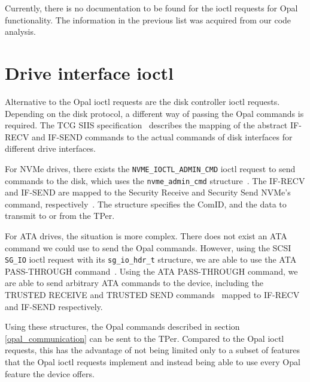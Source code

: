 Currently, there is no documentation to be found for the ioctl requests for Opal functionality. The information in the previous list was acquired from our code analysis.

\section{Drive interface ioctl}
\label{section:direct_communication_raw_ioctl}

Alternative to the Opal ioctl requests are the disk controller ioctl requests. Depending on the disk protocol, a different way of passing the Opal commands is required.
The TCG SIIS specification~\cite{tcg-siis} describes the mapping of the abstract IF-RECV and IF-SEND commands to the actual commands of disk interfaces for different drive interfaces.

For NVMe drives, there exists the \verb|NVME_IOCTL_ADMIN_CMD| ioctl request to send commands to the disk, which uses the \verb|nvme_admin_cmd| structure~\cite{nvme-express-base-specification}. The IF-RECV and IF-SEND are mapped to the Security Receive and Security Send NVMe's command, respectively~\cite{tcg-siis}. The structure specifies the ComID, and the data to transmit to or from the TPer.

For ATA drives, the situation is more complex. There does not exist an ATA command we could use to send the Opal commands.
However, using the SCSI \verb|SG_IO| ioctl request with its \verb|sg_io_hdr_t| structure, we are able to use the ATA PASS-THROUGH command~\cite{ata_passthrough}. Using the ATA PASS-THROUGH command, we are able to send arbitrary ATA commands to the device, including the TRUSTED RECEIVE and TRUSTED SEND commands~\cite{acs-3} mapped to IF-RECV and IF-SEND respectively.





Using these structures, the Opal commands described in section \ref{opal_communication} can be sent to the TPer. Compared to the Opal ioctl requests, this has the advantage of not being limited only to a subset of features that the Opal ioctl requests implement and instead being able to use every Opal feature the device offers. %

